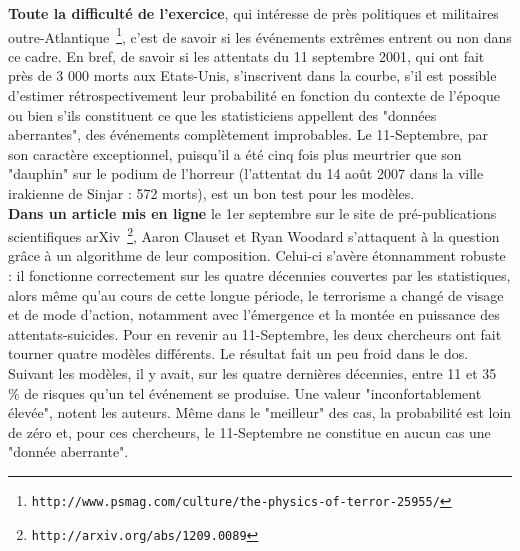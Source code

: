 \documentclass[11pt,twoside,a4paper]{article}
\begin{document}
\begin{multicols}{2}
	\textbf{Toute la difficult{\'e} de l'exercice}, qui int{\'e}resse de pr{\`e}s politiques et militaires outre-Atlantique~\footnote{\texttt{http://www.psmag.com/culture/the-physics-of-terror-25955/}}, c'est de savoir si les {\'e}v{\'e}nements extr{\^e}mes entrent ou non dans ce cadre. En bref, de savoir si les attentats du 11 septembre 2001, qui ont fait pr{\`e}s de 3 000 morts aux Etats-Unis, s'inscrivent dans la courbe, s'il est possible d'estimer r{\'e}trospectivement leur probabilit{\'e} en fonction du contexte de l'{\'e}poque ou bien s'ils constituent ce que les statisticiens appellent des "donn{\'e}es aberrantes", des {\'e}v{\'e}nements compl{\`e}tement improbables. Le 11-Septembre, par son caract{\`e}re exceptionnel, puisqu'il a {\'e}t{\'e} cinq fois plus meurtrier que son "dauphin" sur le podium de l'horreur (l'attentat du 14 ao{\^u}t 2007 dans la ville irakienne de Sinjar : 572 morts), est un bon test pour les mod{\`e}les. ~\\
	
	\textbf{Dans un article mis en ligne} le 1er septembre sur le site de pr{\'e}-publications scientifiques arXiv~\footnote{\texttt{http://arxiv.org/abs/1209.0089}}, Aaron Clauset et Ryan Woodard s'attaquent {\`a} la question gr{\^a}ce {\`a} un algorithme de leur composition. Celui-ci s'av{\`e}re {\'e}tonnamment robuste : il fonctionne correctement sur les quatre d{\'e}cennies couvertes par les statistiques, alors m{\^e}me qu'au cours de cette longue p{\'e}riode, le terrorisme a chang{\'e} de visage et de mode d'action, notamment avec l'{\'e}mergence et la mont{\'e}e en puissance des attentats-suicides. Pour en revenir au 11-Septembre, les deux chercheurs ont fait tourner quatre mod{\`e}les diff{\'e}rents. Le r{\'e}sultat fait un peu froid dans le dos. Suivant les mod{\`e}les, il y avait, sur les quatre derni{\`e}res d{\'e}cennies, entre 11 et 35 \% de risques qu'un tel {\'e}v{\'e}nement se produise. Une valeur "inconfortablement {\'e}lev{\'e}e", notent les auteurs. M{\^e}me dans le "meilleur" des cas, la probabilit{\'e} est loin de z{\'e}ro et, pour ces chercheurs, le 11-Septembre ne constitue en aucun cas une "donn{\'e}e aberrante". ~\\
	

\end{multicols}
\end{document}
